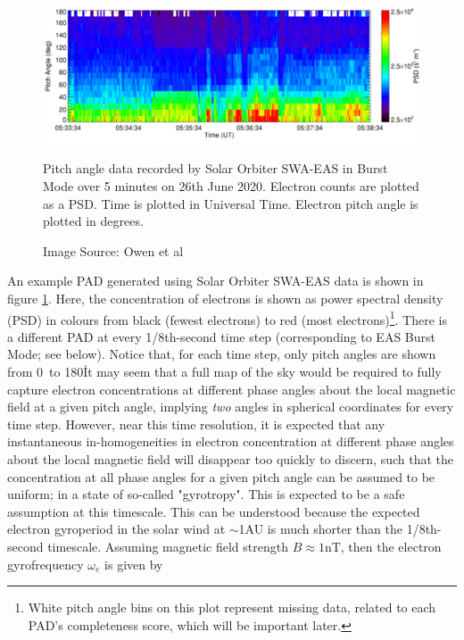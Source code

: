 \begin{figure}[h!]
    \centering
    \includegraphics[width=1\linewidth]{figures/PADexample.png}
    \caption{Pitch angle data recorded by Solar Orbiter SWA-EAS in Burst Mode over 5 minutes on 26th June 2020\cite{owen2021}. Electron counts are plotted as a PSD. Time is plotted in Universal Time. Electron pitch angle is plotted in degrees.}
    \caption*{Image Source: Owen et al\cite{owen2021}}
    \label{PAD example}
\end{figure}

An example PAD generated using Solar Orbiter SWA-EAS data is shown in figure \ref{PAD example}\cite{owen2021}. Here, the concentration of electrons is shown as power spectral density (PSD) in colours from black (fewest electrons) to red (most electrons)\footnote{White pitch angle bins on this plot represent missing data, related to each PAD's completeness score, which will be important later.}. There is a different PAD at every 1/8th-second time step (corresponding to EAS Burst Mode; see below). Notice that, for each time step, only pitch angles are shown from 0\degree\ to 180\degree\. It may seem that a full map of the sky would be required to fully capture electron concentrations at different phase angles about the local magnetic field at a given pitch angle, implying \textit{two} angles in spherical coordinates for every time step. However, near this time resolution, it is expected that any instantaneous in-homogeneities in electron concentration at different phase angles about the local magnetic field will disappear too quickly to discern, such that the concentration at all phase angles for a given pitch angle can be assumed to be uniform; in a state of so-called "gyrotropy"\cite{owen2021}. This is expected to be a safe assumption at this timescale\cite{vocks2012}\cite{spinnangr2022}\cite{owen2021}. This can be understood because the expected electron gyroperiod in the solar wind at \(\sim\)1AU is much shorter than the 1/8th-second timescale. Assuming magnetic field strength \(B\approx1\textrm{nT}\), then the electron gyrofrequency \(\omega_{e}\) is  given by 


